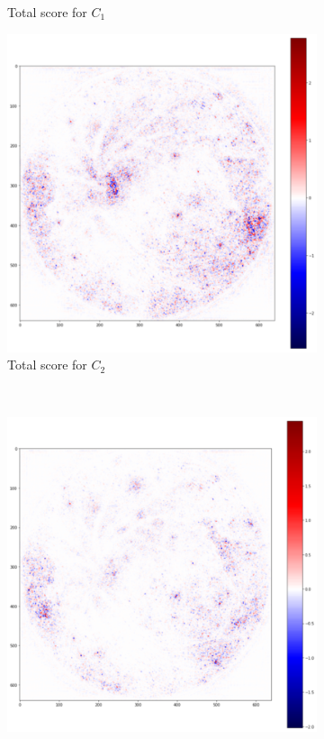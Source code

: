 \documentclass[preprint]{elsarticle}
\theoremstyle{definition} %
\theoremstyle{remark}
\begin{document}
\begin{figure}[h!]
\begin{subfigure}[b]{0.43\textwidth}
		\caption{Total score for $C_1$}
		\label{fig:score_total_c1}
	\end{subfigure}
	\begin{subfigure}[b]{0.43\textwidth}
		\includegraphics[width=\textwidth]{figures/score-prop-23713_left/score_total_c2.png}
		\caption{Total score for $C_2$}
		\label{fig:score_total_c2}
	\end{subfigure}~
	\begin{subfigure}[b]{0.43\textwidth}
		\includegraphics[width=\textwidth]{figures/score-prop-23713_left/score_total_c3.png}

\end{subfigure}
\end{figure}
\end{document}
